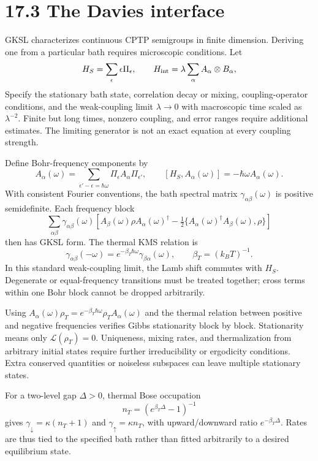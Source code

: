 \documentclass[
  11pt,
  oneside]{book}
\begin{document}
\section{17.3 The Davies interface}

GKSL characterizes continuous CPTP semigroups in finite dimension.
Deriving one from a particular bath requires microscopic conditions. Let
\[
H_S=\sum_\epsilon\epsilon\Pi_\epsilon,\qquad
H_{
\rm int}=\lambda\sum_\alpha A_\alpha\otimes B_\alpha,
\] Specify the stationary bath state, correlation decay or mixing,
coupling-operator conditions, and the weak-coupling limit
\(\lambda\to0\) with macroscopic time scaled as \(\lambda^{-2}\). Finite
but long times, nonzero coupling, and error ranges require additional
estimates. The limiting generator is not an exact equation at every
coupling strength.

Define Bohr-frequency components by \[
A_\alpha(\omega)=
\sum_{\epsilon'-\epsilon=\hbar\omega}
\Pi_\epsilon A_\alpha\Pi_{\epsilon'},
\qquad [H_S,A_\alpha(\omega)]=-\hbar\omega A_\alpha(\omega).
\] With consistent Fourier conventions, the bath spectral matrix
\(\gamma_{\alpha\beta}(\omega)\) is positive semidefinite. Each
frequency block \[
\sum_{\alpha\beta}\gamma_{\alpha\beta}(\omega)
\left[A_\beta(\omega)\rho A_\alpha(\omega)^\dagger
-\tfrac12\{A_\alpha(\omega)^\dagger A_\beta(\omega),\rho\}\right]
\] then has GKSL form. The thermal KMS relation is \[
\gamma_{\alpha\beta}(-\omega)
=e^{-\beta_T\hbar\omega}\gamma_{\beta\alpha}(\omega),
\qquad \beta_T=(k_BT)^{-1}.
\] In this standard weak-coupling limit, the Lamb shift commutes with
\(H_S\). Degenerate or equal-frequency transitions must be treated
together; cross terms within one Bohr block cannot be dropped
arbitrarily.

Using
\(A_\alpha(\omega)\rho_T=e^{-\beta_T\hbar\omega}\rho_T A_\alpha(\omega)\)
and the thermal relation between positive and negative frequencies
verifies Gibbs stationarity block by block. Stationarity means only
\(\mathcal L(\rho_T)=0\). Uniqueness, mixing rates, and thermalization
from arbitrary initial states require further irreducibility or
ergodicity conditions. Extra conserved quantities or noiseless subspaces
can leave multiple stationary states.

For a two-level gap \(\Delta>0\), thermal Bose occupation \[
n_T=(e^{\beta_T\Delta}-1)^{-1}
\] gives \(\gamma_\downarrow=\kappa(n_T+1)\) and
\(\gamma_\uparrow=\kappa n_T\), with upward/downward ratio
\(e^{-\beta_T\Delta}\). Rates are thus tied to the specified bath rather
than fitted arbitrarily to a desired equilibrium state.
\end{document}
